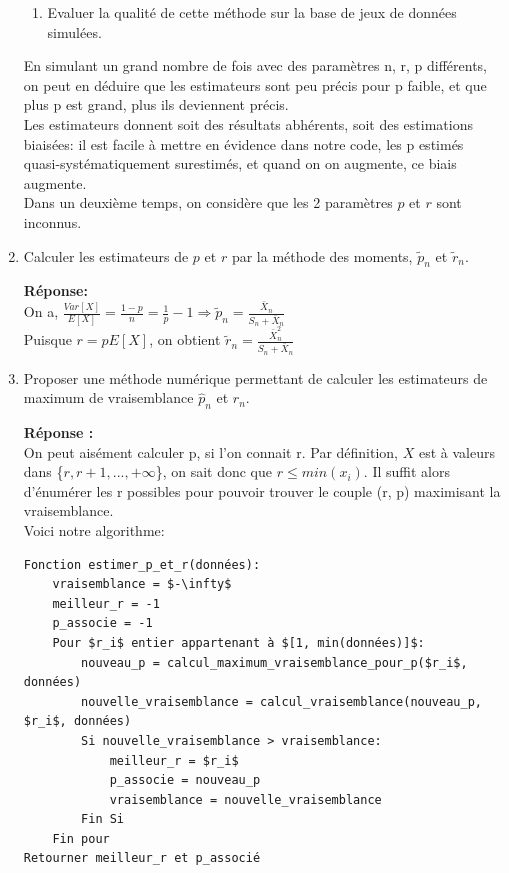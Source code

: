 \documentclass[12pt]{article}
\newcommand{\dsp}{\displaystyle}
\begin{document}
\begin{enumerate}
\begin{enumerate}
\item Evaluer la qualité de cette méthode sur la base de jeux de données simulées.

\end{enumerate}

\vspace{3mm}

En simulant un grand nombre de fois avec des paramètres n, r, p différents, on peut en déduire que les estimateurs sont peu précis pour p faible, et que plus p est grand, plus ils deviennent précis. \\
Les estimateurs donnent soit des résultats abhérents, soit des estimations biaisées: il est facile à mettre en évidence dans notre code, les p estimés quasi-systématiquement surestimés, et quand on on augmente, ce biais augmente. \\

\hspace{-5mm} Dans un deuxième temps, on considère que les 2 paramètres $p$ et $r$ sont inconnus.

\vspace{3mm}

\item Calculer les estimateurs de $p$ et $r$ par la méthode des moments, $\tilde{p}_n$ et $\tilde{r}_n$.

\textbf{Réponse:\\}
On a, $ \dsp \frac{Var[X]}{E[X]} = \frac{1-p}{n} = \frac{1}{p} - 1 \Rightarrow \tilde{p}_n = \frac{\bar{X}_n}{S_n+\bar{X}_n} $ \\
Puisque $ r= p E[X]$, on obtient $\dsp \tilde{r}_n = \frac{ \bar{X}_n^2}{S_n + \bar{X}_n} $
\vspace{3mm}

\item Proposer une méthode numérique permettant de calculer les estimateurs de maximum de vraisemblance $\hat{p}_n$ et $\hat{r}_n$.

\textbf{Réponse :\\}
On peut aisément calculer p, si l'on connait r.
Par définition, $X$ est à valeurs dans \{$r, r+1, ..., +\infty$\}, on sait donc que $r \leq min(x_i)$.
Il suffit alors d'énumérer les r possibles pour pouvoir trouver le couple (r, p) maximisant la vraisemblance. \\
Voici notre algorithme:
\begin{verbatim}
Fonction estimer_p_et_r(données):
    vraisemblance = $-\infty$
    meilleur_r = -1
    p_associe = -1
    Pour $r_i$ entier appartenant à $[1, min(données)]$:
        nouveau_p = calcul_maximum_vraisemblance_pour_p($r_i$, données)
        nouvelle_vraisemblance = calcul_vraisemblance(nouveau_p, $r_i$, données)
        Si nouvelle_vraisemblance > vraisemblance:
            meilleur_r = $r_i$
            p_associe = nouveau_p
            vraisemblance = nouvelle_vraisemblance
        Fin Si
    Fin pour
Retourner meilleur_r et p_associé
\end{verbatim}
\end{enumerate}
\end{document}
